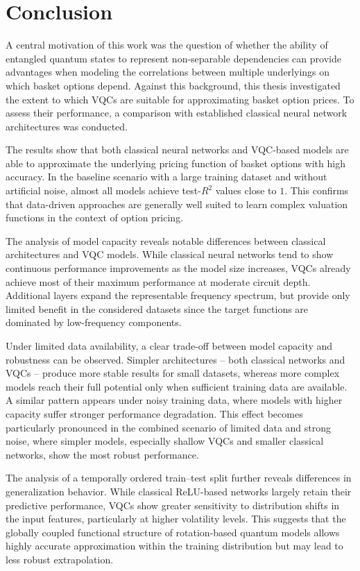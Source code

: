 \chapter{Conclusion}

A central motivation of this work was the question of whether the
ability of entangled quantum states to represent non-separable
dependencies can provide advantages when modeling the correlations
between multiple underlyings on which basket options depend.
Against this background, this thesis investigated the extent to
which VQCs are suitable for approximating basket option prices.
To assess their performance, a comparison with established classical
neural network architectures was conducted.

The results show that both classical neural networks and VQC-based
models are able to approximate the underlying pricing function of
basket options with high accuracy. In the baseline scenario with a
large training dataset and without artificial noise, almost all
models achieve test-$R^2$ values close to $1$. This confirms that
data-driven approaches are generally well suited to learn complex
valuation functions in the context of option pricing.

The analysis of model capacity reveals notable differences between
classical architectures and VQC models. While classical neural
networks tend to show continuous performance improvements as the
model size increases, VQCs already achieve most of their maximum
performance at moderate circuit depth. Additional layers expand
the representable frequency spectrum, but provide only limited
benefit in the considered datasets since the target functions are
dominated by low-frequency components.

Under limited data availability, a clear trade-off between model
capacity and robustness can be observed. Simpler architectures --
both classical networks and VQCs -- produce more stable results for
small datasets, whereas more complex models reach their full
potential only when sufficient training data are available.
A similar pattern appears under noisy training data, where models
with higher capacity suffer stronger performance degradation.
This effect becomes particularly pronounced in the combined
scenario of limited data and strong noise, where simpler models,
especially shallow VQCs and smaller classical networks, show the
most robust performance.

The analysis of a temporally ordered train–test split further
reveals differences in generalization behavior. While classical
ReLU-based networks largely retain their predictive performance,
VQCs show greater sensitivity to distribution shifts in the
input features, particularly at higher volatility levels.
This suggests that the globally coupled functional structure
of rotation-based quantum models allows highly accurate
approximation within the training distribution but may lead
to less robust extrapolation.

